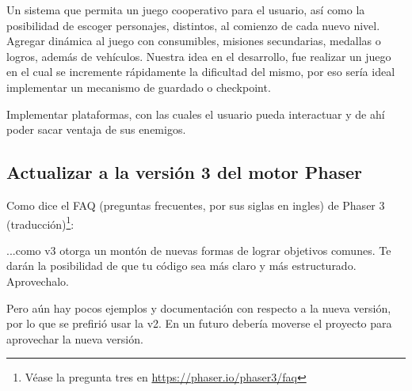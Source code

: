 \documentclass{article}
\begin{document}
	Un sistema que permita un juego cooperativo para el usuario, así como la posibilidad de escoger personajes, distintos, al comienzo de cada nuevo nivel. 
	Agregar dinámica al juego con consumibles, misiones secundarias, medallas o logros, además de vehículos. Nuestra idea en el desarrollo, fue realizar un juego en el cual se incremente rápidamente la dificultad del mismo, por eso sería ideal implementar un mecanismo de guardado o checkpoint.
	
	Implementar plataformas, con las cuales el usuario pueda interactuar y de ahí poder sacar ventaja de sus enemigos.
	
	\subsection*{Actualizar a la versión 3 del motor Phaser}
	
	Como dice el FAQ (preguntas frecuentes, por sus siglas en ingles) de Phaser 3 (traducción)\footnote{Véase la pregunta tres en \url{https://phaser.io/phaser3/faq}}:
	\begin{displayquote}
	 	...como v3 otorga un montón de nuevas formas de lograr objetivos comunes. Te darán la posibilidad de que tu código sea más claro y más estructurado. Aprovechalo.
	\end{displayquote}
	
	Pero aún hay pocos ejemplos y documentación con respecto a la nueva versión, por lo que se prefirió usar la v2. En un futuro debería moverse el proyecto para aprovechar la nueva versión.
\end{document}

